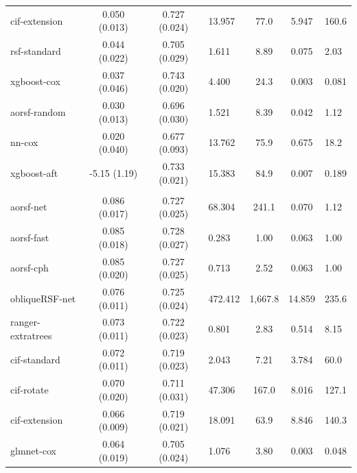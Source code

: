 \documentclass[twoside,11pt]{article}\usepackage[]{graphicx}\usepackage[]{xcolor}
\newenvironment{knitrout}{}{} %
\begin{document}
\begin{knitrout}
\begin{longtable}{lcclccl}
\hspace{1em}cif-extension & 0.050 (0.013) & 0.727 (0.024) & 13.957 & 77.0 & 5.947 & 160.6\\
\hspace{1em}rsf-standard & 0.044 (0.022) & 0.705 (0.029) & 1.611 & 8.89 & 0.075 & 2.03\\
\hspace{1em}xgboost-cox & 0.037 (0.046) & 0.743 (0.020) & 4.400 & 24.3 & 0.003 & 0.081\\
\hspace{1em}aorsf-random & 0.030 (0.013) & 0.696 (0.030) & 1.521 & 8.39 & 0.042 & 1.12\\
\hspace{1em}nn-cox & 0.020 (0.040) & 0.677 (0.093) & 13.762 & 75.9 & 0.675 & 18.2\\
\hspace{1em}xgboost-aft & -5.15 (1.19) & 0.733 (0.021) & 15.383 & 84.9 & 0.007 & 0.189\\
\addlinespace[0.3em]
\hline
\multicolumn{7}{l}{\textit{\textbf{GUIDE-IT; HF hospitalization, n = 894, p = 59}}}\\
\hline
\hspace{1em}aorsf-net & 0.086 (0.017) & 0.727 (0.025) & 68.304 & 241.1 & 0.070 & 1.12\\
\hspace{1em}aorsf-fast & 0.085 (0.018) & 0.728 (0.027) & 0.283 & 1.00 & 0.063 & 1.00\\
\hspace{1em}aorsf-cph & 0.085 (0.020) & 0.727 (0.025) & 0.713 & 2.52 & 0.063 & 1.00\\
\hspace{1em}obliqueRSF-net & 0.076 (0.011) & 0.725 (0.024) & 472.412 & 1,667.8 & 14.859 & 235.6\\
\hspace{1em}ranger-extratrees & 0.073 (0.011) & 0.722 (0.023) & 0.801 & 2.83 & 0.514 & 8.15\\
\hspace{1em}cif-standard & 0.072 (0.011) & 0.719 (0.023) & 2.043 & 7.21 & 3.784 & 60.0\\
\hspace{1em}cif-rotate & 0.070 (0.020) & 0.711 (0.031) & 47.306 & 167.0 & 8.016 & 127.1\\
\hspace{1em}cif-extension & 0.066 (0.009) & 0.719 (0.021) & 18.091 & 63.9 & 8.846 & 140.3\\
\hspace{1em}glmnet-cox & 0.064 (0.019) & 0.705 (0.024) & 1.076 & 3.80 & 0.003 & 0.048\\

\end{longtable}
\end{knitrout}
\end{document}
